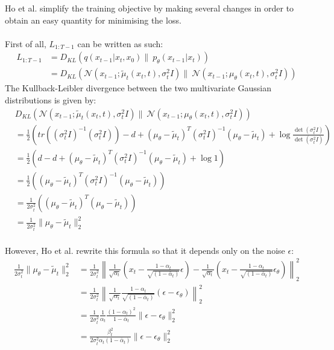 \documentclass{article}
\begin{document}
Ho et al. \cite{ho2020denoising} simplify the training objective by making several changes in order to obtain an easy quantity for minimising the loss. 
\\\\
First of all, $L_{1: T-1}$ can be written as such:
\begin{align}
  L_{1:T-1} &= D_{KL}\left(q\left(x_{t-1} | x_t, x_0\right) \| \: p_{\theta}\left(x_{t-1} | x_t\right)\right) \\
  &= D_{KL}\left(\mathcal{N} (x_{t-1}; \tilde{\mu}_t \left(x_t, t \right), \sigma^2_t I ) \| \: \mathcal{N} \left( x_{t-1} ; \mu_{\theta}(x_t, t), \sigma^2_t I  \right) \right)
\end{align}
{
  \allowdisplaybreaks
  The Kullback-Leibler divergence between the two multivariate Gaussian distributions is given by:
  \begin{align}
    & D_{KL}\left(\mathcal{N} (x_{t-1}; \tilde{\mu}_t \left(x_t, t \right), \sigma^2_t I ) \| \: \mathcal{N} \left( x_{t-1} ; \mu_{\theta}(x_t, t), \sigma^2_t I  \right) \right) \\
    &= \frac{1}{2} \left( tr\left( (\sigma^2_t I)^{-1} (\sigma^2_t I) \right) - d + \left( \mu_{\theta} - \tilde{\mu}_t \right)^T (\sigma^2_t I)^{-1} \left( \mu_{\theta} - \tilde{\mu}_t \right) + \log \frac{\det(\sigma^2_t I)}{\det(\sigma^2_t I)} \right) \\
    &= \frac{1}{2} \left( d - d + \left( \mu_{\theta} - \tilde{\mu}_t \right)^T (\sigma^2_t I)^{-1} \left( \mu_{\theta} - \tilde{\mu}_t \right) + \log 1 \right) \\
    &= \frac{1}{2} \left( \left( \mu_{\theta} - \tilde{\mu}_t \right)^T (\sigma^2_t I)^{-1} \left( \mu_{\theta} - \tilde{\mu}_t \right) \right) \\
    &= \frac{1}{2 \sigma^2_t} \left( \left( \mu_{\theta} - \tilde{\mu}_t \right)^T \left( \mu_{\theta} - \tilde{\mu}_t \right) \right) \\
    &= \frac{1}{2 \sigma^2_t} \| \mu_{\theta} - \tilde{\mu}_t \|_2^2
  \end{align}
  \\
  However, Ho et al. \cite{ho2020denoising} rewrite this formula so that it depends only on the noise $\epsilon$:
  \begin{align}
    \frac{1}{2 \sigma^2_t} \| \mu_{\theta} - \tilde{\mu}_t \|_2^2 &= \frac{1}{2 \sigma^2_t} \left\| \frac{1}{\sqrt{\alpha_t}} \left( x_t - \frac{1 - \alpha_t}{\sqrt{(1 - \bar{\alpha}_t)}} \epsilon \right) - \frac{1}{\sqrt{\alpha_t}} \left( x_t - \frac{1 - \alpha_t}{\sqrt{(1 - \bar{\alpha}_t)}} \epsilon_\theta \right)\right\|_2^2 \\
    &= \frac{1}{2 \sigma^2_t} \left\| \frac{1}{\sqrt{\alpha_t}} \frac{1 - \alpha_t}{\sqrt{(1 - \bar{\alpha}_t)}} (\epsilon - \epsilon_\theta) \right\|_2^2 \\
    &= \frac{1}{2 \sigma^2_t} \frac{1}{\alpha_t} \frac{(1 - \alpha_t)^2}{1 - \bar{\alpha}_t} \| \epsilon - \epsilon_\theta \|_2^2 \\
    &= \frac{\beta_t^2}{2 \sigma^2_t \alpha_t (1 - \bar{\alpha}_t)} \| \epsilon - \epsilon_\theta \|_2^2
  \end{align}
}
\end{document}
